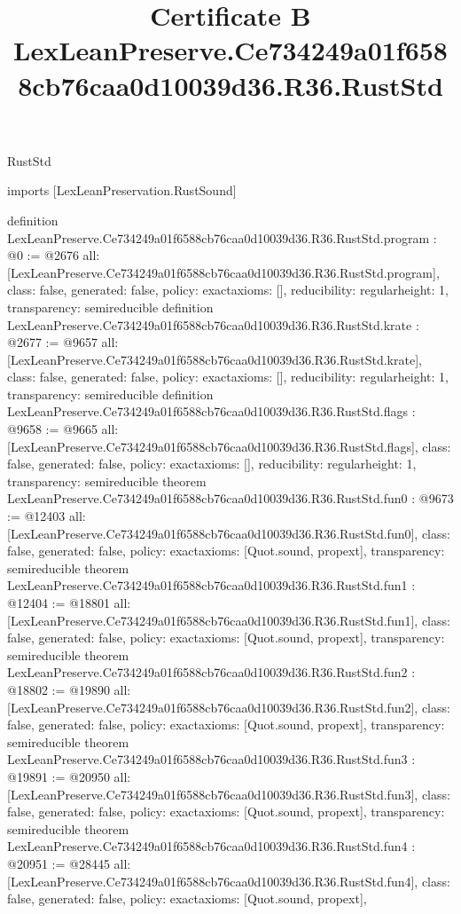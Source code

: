 \begin{lexlean}{RustStd}
\title{Certificate B LexLeanPreserve.Ce734249a01f6588cb76caa0d10039d36.R36.RustStd}
\begin{coremodule}
imports [LexLeanPreservation.RustSound]

definition LexLeanPreserve.Ce734249a01f6588cb76caa0d10039d36.R36.RustStd.program : @0 := @2676 {
  all: [LexLeanPreserve.Ce734249a01f6588cb76caa0d10039d36.R36.RustStd.program],
  class: false,
  generated: false,
  policy: exact{axioms: []},
  reducibility: regular{height: 1},
  transparency: semireducible
}
definition LexLeanPreserve.Ce734249a01f6588cb76caa0d10039d36.R36.RustStd.krate : @2677 := @9657 {
  all: [LexLeanPreserve.Ce734249a01f6588cb76caa0d10039d36.R36.RustStd.krate],
  class: false,
  generated: false,
  policy: exact{axioms: []},
  reducibility: regular{height: 1},
  transparency: semireducible
}
definition LexLeanPreserve.Ce734249a01f6588cb76caa0d10039d36.R36.RustStd.flags : @9658 := @9665 {
  all: [LexLeanPreserve.Ce734249a01f6588cb76caa0d10039d36.R36.RustStd.flags],
  class: false,
  generated: false,
  policy: exact{axioms: []},
  reducibility: regular{height: 1},
  transparency: semireducible
}
theorem LexLeanPreserve.Ce734249a01f6588cb76caa0d10039d36.R36.RustStd.fun0 : @9673 := @12403 {
  all: [LexLeanPreserve.Ce734249a01f6588cb76caa0d10039d36.R36.RustStd.fun0],
  class: false,
  generated: false,
  policy: exact{axioms: [Quot.sound, propext]},
  transparency: semireducible
}
theorem LexLeanPreserve.Ce734249a01f6588cb76caa0d10039d36.R36.RustStd.fun1 : @12404 := @18801 {
  all: [LexLeanPreserve.Ce734249a01f6588cb76caa0d10039d36.R36.RustStd.fun1],
  class: false,
  generated: false,
  policy: exact{axioms: [Quot.sound, propext]},
  transparency: semireducible
}
theorem LexLeanPreserve.Ce734249a01f6588cb76caa0d10039d36.R36.RustStd.fun2 : @18802 := @19890 {
  all: [LexLeanPreserve.Ce734249a01f6588cb76caa0d10039d36.R36.RustStd.fun2],
  class: false,
  generated: false,
  policy: exact{axioms: [Quot.sound, propext]},
  transparency: semireducible
}
theorem LexLeanPreserve.Ce734249a01f6588cb76caa0d10039d36.R36.RustStd.fun3 : @19891 := @20950 {
  all: [LexLeanPreserve.Ce734249a01f6588cb76caa0d10039d36.R36.RustStd.fun3],
  class: false,
  generated: false,
  policy: exact{axioms: [Quot.sound, propext]},
  transparency: semireducible
}
theorem LexLeanPreserve.Ce734249a01f6588cb76caa0d10039d36.R36.RustStd.fun4 : @20951 := @28445 {
  all: [LexLeanPreserve.Ce734249a01f6588cb76caa0d10039d36.R36.RustStd.fun4],
  class: false,
  generated: false,
  policy: exact{axioms: [Quot.sound, propext]},
}
\end{coremodule}
\end{lexlean}
